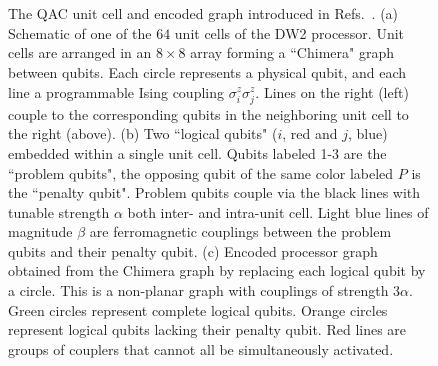 \begin{figure}[t]
\begin{center}
\\
\\
\end{center}
\caption{The QAC unit cell and encoded graph introduced in Refs.~\cite{PAL:13,PAL:14}. (a) Schematic of one of the $64$ {unit cells} of the DW2 processor. Unit cells are arranged in an $8\times 8$ array forming a ``Chimera" graph between qubits. Each circle represents a physical qubit, and each line a programmable Ising coupling $\sigma^z_i\sigma^z_j$. Lines on the right (left) couple to the corresponding qubits in the neighboring unit cell to the right (above).
(b) Two ``logical qubits" ($i$, red and $j$, blue) embedded within a single unit cell. Qubits labeled 1-3 are the ``problem qubits", the opposing qubit of the same color labeled $P$ is the ``penalty qubit". Problem qubits couple via the black lines with tunable strength $\alpha$ both inter- and intra-unit cell. Light blue lines of magnitude $\beta$ are ferromagnetic couplings between the problem qubits and their penalty qubit. (c) Encoded processor graph obtained from the Chimera graph by replacing each logical qubit by a circle. This is a non-planar graph with couplings of strength $3\alpha$. Green circles represent  complete logical qubits. Orange circles represent logical qubits lacking their penalty qubit. Red lines are {groups of} couplers that cannot {all} be simultaneously activated.
}
\label{fig:QAC}
\end{figure}

